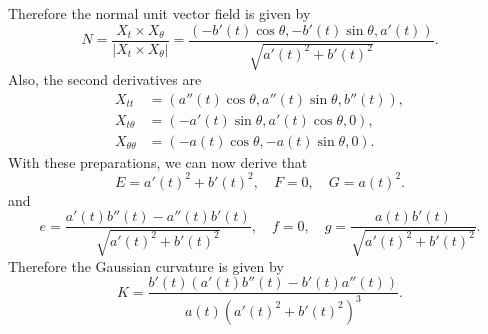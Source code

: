 Therefore the normal unit vector field is given by
\[N=\frac{X_t\times X_\theta}{|X_t\times X_{\theta}|}=\frac{(-b'(t)\cos\theta,-b'(t)\sin\theta,a'(t))}{\sqrt{a'(t)^2+b'(t)^2}}.\]
Also, the second derivatives are
\begin{align*}
X_{tt}&=(a''(t)\cos\theta,a''(t)\sin\theta,b''(t)),\\
X_{t\theta}&=(-a'(t)\sin\theta,a'(t)\cos\theta,0),\\
X_{\theta\theta}&=(-a(t)\cos\theta,-a(t)\sin\theta,0).
\end{align*}
With these preparations, we can now derive that
\[E=a'(t)^2+b'(t)^2,\quad F=0,\quad G=a(t)^2.\]
and
\[e=\frac{a'(t)b''(t)-a''(t)b'(t)}{\sqrt{a'(t)^2+b'(t)^2}},\quad f=0,\quad g=\frac{a(t)b'(t)}{\sqrt{a'(t)^2+b'(t)^2}}.\]
Therefore the Gaussian curvature is given by
\[K=\frac{b'(t)(a'(t)b''(t)-b'(t)a''(t))}{a(t)(a'(t)^2+b'(t)^2)^3}.\]
